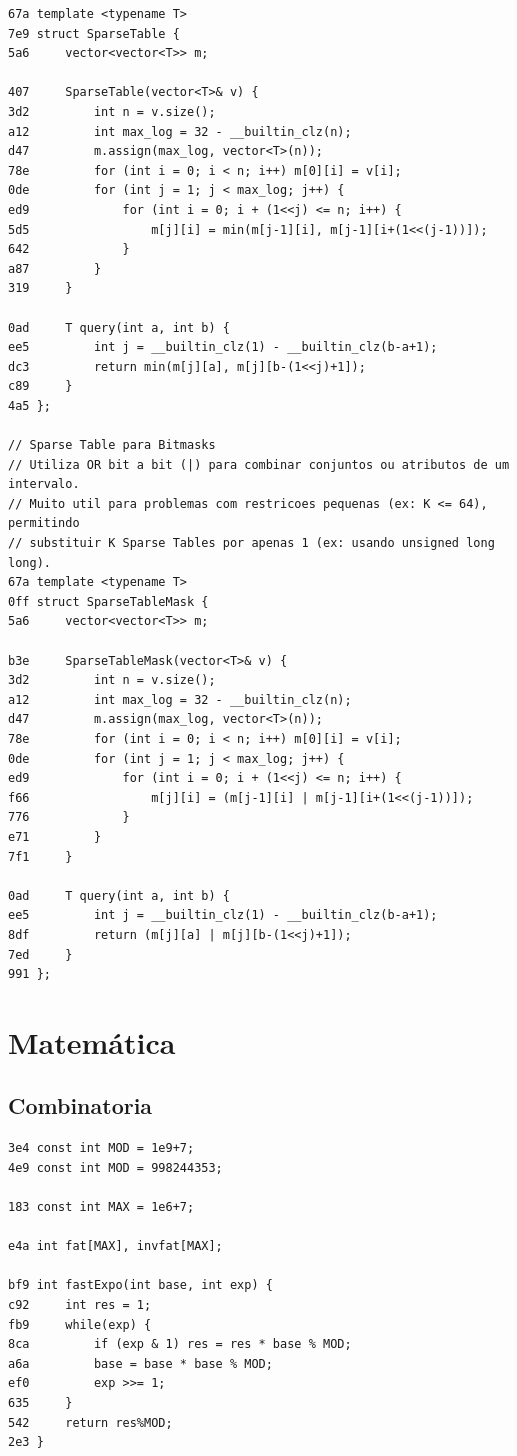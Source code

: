 \documentclass[11pt, a4paper, twoside]{article}
\begin{document}
{\begin{lstlisting}
67a template <typename T>
7e9 struct SparseTable {
5a6 	vector<vector<T>> m;
    	
407 	SparseTable(vector<T>& v) {
3d2 		int n = v.size();
a12 		int max_log = 32 - __builtin_clz(n);
d47 		m.assign(max_log, vector<T>(n));
78e 		for (int i = 0; i < n; i++) m[0][i] = v[i];
0de 		for (int j = 1; j < max_log; j++) {
ed9 			for (int i = 0; i + (1<<j) <= n; i++) {
5d5 				m[j][i] = min(m[j-1][i], m[j-1][i+(1<<(j-1))]);
642 			}
a87 		}
319 	}
    	
0ad 	T query(int a, int b) {
ee5 		int j = __builtin_clz(1) - __builtin_clz(b-a+1);
dc3 		return min(m[j][a], m[j][b-(1<<j)+1]);
c89 	}
4a5 };

// Sparse Table para Bitmasks
// Utiliza OR bit a bit (|) para combinar conjuntos ou atributos de um intervalo.
// Muito util para problemas com restricoes pequenas (ex: K <= 64), permitindo
// substituir K Sparse Tables por apenas 1 (ex: usando unsigned long long).
67a template <typename T>
0ff struct SparseTableMask {
5a6 	vector<vector<T>> m;
    	
b3e 	SparseTableMask(vector<T>& v) {
3d2 		int n = v.size();
a12 		int max_log = 32 - __builtin_clz(n);
d47 		m.assign(max_log, vector<T>(n));
78e 		for (int i = 0; i < n; i++) m[0][i] = v[i];
0de 		for (int j = 1; j < max_log; j++) {
ed9 			for (int i = 0; i + (1<<j) <= n; i++) {
f66 				m[j][i] = (m[j-1][i] | m[j-1][i+(1<<(j-1))]);
776 			}
e71 		}
7f1 	}
    	
0ad 	T query(int a, int b) {
ee5 		int j = __builtin_clz(1) - __builtin_clz(b-a+1);
8df 		return (m[j][a] | m[j][b-(1<<j)+1]);
7ed 	}
991 };
\end{lstlisting}



%
%

\section{Matemática}

\subsection{Combinatoria}
\begin{lstlisting}
3e4 const int MOD = 1e9+7;
4e9 const int MOD = 998244353;

183 const int MAX = 1e6+7;

e4a int fat[MAX], invfat[MAX];

bf9 int fastExpo(int base, int exp) {
c92     int res = 1;
fb9     while(exp) {
8ca         if (exp & 1) res = res * base % MOD;
a6a         base = base * base % MOD;
ef0         exp >>= 1;
635     }
542     return res%MOD;
2e3 }


\end{lstlisting}}
\end{document}
